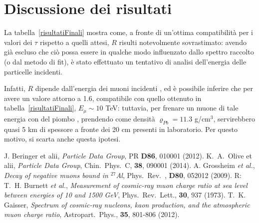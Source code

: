 \documentclass[10pt, oneside, a4paper]{article}   	%
\renewcommand{\rho}{\varrho}				%
\begin{document}
\section{Discussione dei risultati}

La tabella~\ref{risultatiFinali} mostra come, a fronte di un'ottima compatibilità per i valori dei $\tau$ rispetto a quelli attesi, $R$ risulti notevolmente sovrastimato: avendo già escluso che ciò possa essere in qualche modo influenzato dallo spettro raccolto (o dal metodo di fit), è stato effettuato un tentativo di analisi dell'energia delle particelle incidenti.

Infatti, $R$ dipende dall'energia dei muoni incidenti \cite{pb}, ed è possibile inferire che per avere un valore attorno a 1.6, compatibile con quello ottenuto in tabella~\ref{risultatiFinali}, $E_{\mu} \sim 10$ TeV: tuttavia, per frenare un muone di tale energia con del piombo \cite{pdg}, prendendo come densità $ \rho_{Pb} = 11.3 $ g/cm$^3$, servirebbero quasi 5 km di spessore a fronte dei 20 cm presenti in laboratorio. Per questo motivo, si scarta anche questa ipotesi. %

\appendix


%
\begin{thebibliography}{4}
%
J. Beringer et alii, \emph{Particle Data Group}, PR \textbf{D86}, 010001 (2012).
%
K.~A.~Olive et alii, \emph{Particle Data Group}, Chin.~Phys.~C, \textbf{38}, 090001 (2014).
%
A. Grossheim \emph{et al.}, \emph{Decay of negative muons bound in $^{27}$Al}, Phys.~Rev.~, \textbf{D80}, 052012 (2009). 
%
 R: T.~H. Burnett \emph{et al.}, \emph{Measurement of cosmic-ray muon charge ratio at sea level between energies of 10 and 1500 GeV}, Phys.~Rev.~Lett., \textbf{30}, 937 (1973).
%
T.~K. Gaisser, \emph{Spectrum of cosmic-ray nucleons, kaon production, and the atmospheric muon charge ratio}, Astropart.~Phys., \textbf{35}, 801-806 (2012).
\end{thebibliography}
\end{document}
